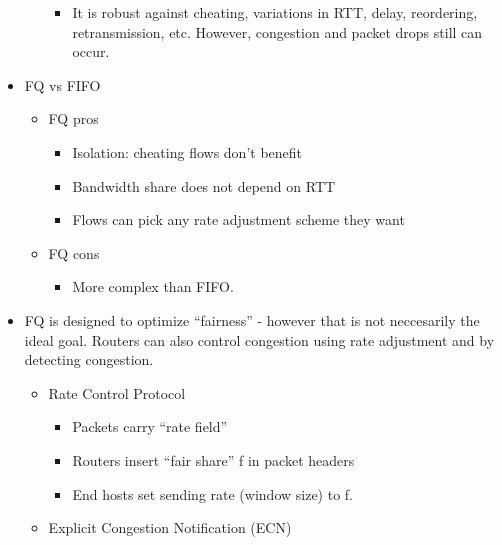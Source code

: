 \begin{itemize}
\begin{itemize}
    \begin{itemize}
    \tightlist
    \item
      It is robust against cheating, variations in RTT, delay,
      reordering, retransmission, etc. However, congestion and packet
      drops still can occur.
    \end{itemize}
  \end{itemize}
\item
  FQ vs FIFO

  \begin{itemize}
  \tightlist
  \item
    FQ pros

    \begin{itemize}
    \tightlist
    \item
      Isolation: cheating flows don't benefit
    \item
      Bandwidth share does not depend on RTT
    \item
      Flows can pick any rate adjustment scheme they want
    \end{itemize}
  \item
    FQ cons

    \begin{itemize}
    \tightlist
    \item
      More complex than FIFO.
    \end{itemize}
  \end{itemize}
\item
  FQ is designed to optimize ``fairness'' - however that is not
  neccesarily the ideal goal. Routers can also control congestion using
  rate adjustment and by detecting congestion.

  \begin{itemize}
  \tightlist
  \item
    Rate Control Protocol

    \begin{itemize}
    \tightlist
    \item
      Packets carry ``rate field''
    \item
      Routers insert ``fair share'' f in packet headers
    \item
      End hosts set sending rate (window size) to f.
    \end{itemize}
  \item
    Explicit Congestion Notification (ECN)


\end{itemize}
\end{itemize}
